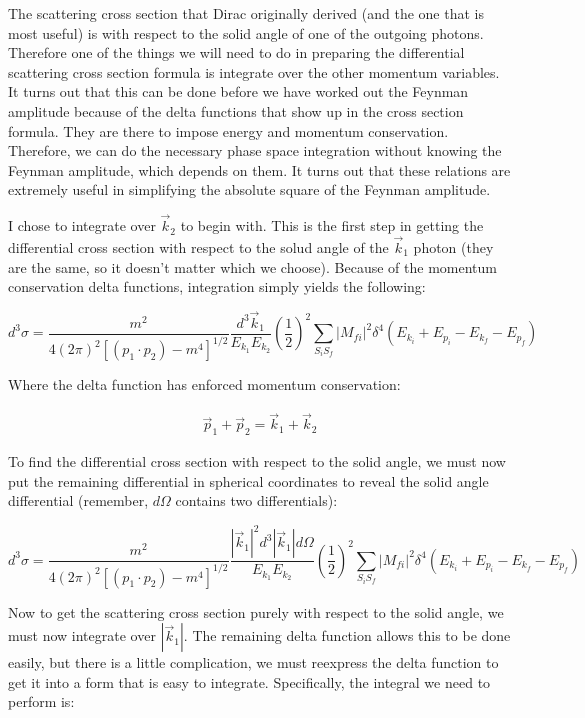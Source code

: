 \documentclass[a4]{article}
\begin{document}
    The scattering cross section that Dirac originally derived (and the one that is most useful) is with respect to the solid angle of one of the outgoing photons. Therefore one of the things we will need to do in preparing
    the differential scattering cross section formula is integrate over the other momentum variables. It turns out that this can be done before we have worked out the Feynman amplitude because of the delta functions that show
    up in the cross section formula. They are there to impose energy and momentum conservation. Therefore, we can do the necessary phase space integration without knowing the Feynman amplitude, which depends on them. It turns
    out that these relations are extremely useful in simplifying the absolute square of the Feynman amplitude.

    I chose to integrate over $\vec{k}_2$ to begin with. This is the first step in getting the differential cross section with respect to the solud angle of the $\vec{k}_1$ photon (they are the same, so it doesn't matter which
    we choose). Because of the momentum conservation delta functions, integration simply yields the following:

    \begin{equation}
        d^3 \sigma = \frac{m^2}{4 (2 \pi)^2 [(p_1 \cdot p_2) - m^4]^{1/2}} \frac{d^3 \vec{k}_1}{E_{k_1} E_{k_2}} (\frac{1}{2})^2 \sum_{S_i S_f} |M_{fi}|^2 \delta^4 (E_{k_i} + E_{p_i} - E_{k_f} - E_{p_f})
    \end{equation}

    Where the delta function has enforced momentum conservation:

    \begin{eqnarray}
        \vec{p}_1 + \vec{p}_2 = \vec{k}_1 + \vec{k}_2
    \end{eqnarray}

    To find the differential cross section with respect to the solid angle, we must now put the remaining differential in spherical coordinates to reveal the solid angle differential (remember, $d \Omega$ contains two differentials):

    \begin{equation}
        d^3 \sigma = \frac{m^2}{4 (2 \pi)^2 [(p_1 \cdot p_2) - m^4]^{1/2}} \frac{|\vec{k}_1|^2 d^3 |\vec{k}_1| d \Omega}{E_{k_1} E_{k_2}} (\frac{1}{2})^2 \sum_{S_i S_f} |M_{fi}|^2 \delta^4 (E_{k_i} + E_{p_i} - E_{k_f} - E_{p_f})
    \end{equation}

    Now to get the scattering cross section purely with respect to the solid angle, we must now integrate over $|\vec{k}_1|$. The remaining delta function allows this to be done easily, but there is a little complication, we must reexpress
    the delta function to get it into a form that is easy to integrate. Specifically, the integral we need to perform is:
\end{document}
